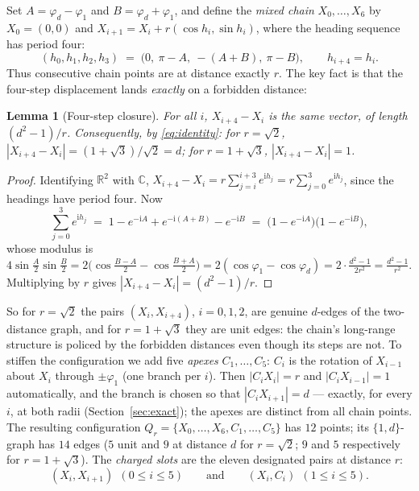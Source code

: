 \documentclass[11pt]{article}
\newtheorem{lemma}[theorem]{Lemma}
\theoremstyle{definition}
\theoremstyle{remark}
\newcommand{\R}{\mathbb{R}}
\newcommand{\dd}{d}                          %
\begin{document}
Set $A=\varphi_{\dd}-\varphi_1$ and $B=\varphi_{\dd}+\varphi_1$, and
define the \emph{mixed chain} $X_0,\dots,X_6$ by $X_0=(0,0)$ and
$X_{i+1}=X_i+r(\cos h_i,\sin h_i)$, where the heading sequence has period
four:
\[
  (h_0,h_1,h_2,h_3)\;=\;\bigl(0,\ \pi-A,\ -(A+B),\ \pi-B\bigr),
  \qquad h_{i+4}=h_i .
\]
Thus consecutive chain points are at distance exactly $r$.  The key fact
is that the four-step displacement lands \emph{exactly} on a forbidden
distance:

\begin{lemma}[Four-step closure]\label{lem:closure}
For all $i$, $X_{i+4}-X_i$ is the same vector, of length
$(\dd^2-1)/r$.  Consequently, by \eqref{eq:identity}:
for $r=\sqrt2$, $|X_{i+4}-X_i|=(1+\sqrt3)/\sqrt2=\dd$;
for $r=1+\sqrt3$, $|X_{i+4}-X_i|=1$.
\end{lemma}

\begin{proof}
Identifying $\R^2$ with $\mathbb C$,
$X_{i+4}-X_i=r\sum_{j=i}^{i+3}e^{\mathrm i h_j}
=r\sum_{j=0}^{3}e^{\mathrm i h_j}$, since the headings have period four.
Now
\[
  \sum_{j=0}^{3}e^{\mathrm i h_j}
  \;=\;1-e^{-\mathrm iA}+e^{-\mathrm i(A+B)}-e^{-\mathrm iB}
  \;=\;\bigl(1-e^{-\mathrm iA}\bigr)\bigl(1-e^{-\mathrm iB}\bigr),
\]
whose modulus is $4\sin\tfrac A2\sin\tfrac B2
=2\bigl(\cos\tfrac{B-A}2-\cos\tfrac{B+A}2\bigr)
=2(\cos\varphi_1-\cos\varphi_{\dd})
=2\cdot\tfrac{\dd^2-1}{2r^2}=\tfrac{\dd^2-1}{r^2}$.
Multiplying by $r$ gives $|X_{i+4}-X_i|=(\dd^2-1)/r$.
\end{proof}

So for $r=\sqrt2$ the pairs $(X_i,X_{i+4})$, $i=0,1,2$, are genuine
$\dd$-edges of the two-distance graph, and for $r=1+\sqrt3$ they are unit
edges: the chain's long-range structure is policed by the forbidden
distances even though its steps are not.  To stiffen the configuration we
add five \emph{apexes} $C_1,\dots,C_5$: $C_i$ is the rotation of
$X_{i-1}$ about $X_i$ through $\pm\varphi_1$ (one branch per $i$).  Then
$|C_iX_i|=r$ and $|C_iX_{i-1}|=1$ automatically, and the branch is chosen
so that $|C_iX_{i+1}|=\dd$ --- exactly, for every $i$, at both radii
(Section~\ref{sec:exact}); the apexes are distinct from all chain
points.  The resulting configuration
$Q_r=\{X_0,\dots,X_6,C_1,\dots,C_5\}$ has $12$ points; its
$\{1,\dd\}$-graph has $14$ edges ($5$ unit and $9$ at distance $\dd$ for
$r=\sqrt2$; $9$ and $5$ respectively for $r=1+\sqrt3$).  The
\emph{charged slots} are the eleven designated pairs at distance $r$:
\[
  (X_i,X_{i+1})\ \ (0\le i\le 5)
  \qquad\text{and}\qquad
  (X_i,C_i)\ \ (1\le i\le 5).
\]
\end{document}
